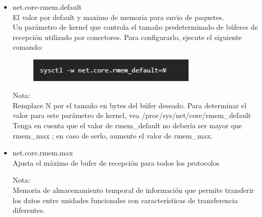 \begin{itemize}
\item net.core-rmem.default
	\\El valor por default y maximo de memoria para envio de paquetes.
	\\Un parámetro de kernel que controla el tamaño predeterminado de búferes de recepción utilizado por conectores. Para configurarlo, ejecute el siguiente comando:

\begin{figure}[htb]
\begin{center}
\includegraphics[width=8cm]{./Imagenes/ajhordy}
\end{center}
\end{figure}

Nota:
\\Remplace N por el tamaño en bytes del búfer deseado. Para determinar el valor para este parámetro de kernel, vea {/proc/sys/net/core/rmem\_default} 
\\Tenga en cuenta que el valor de rmem\_default no debería ser mayor que rmem\_max ; en caso de serlo, aumente el valor de rmem\_max.

	\item net.core.rmem.max
	\\Ajusta el m\'aximo de bufer de recepci\'on para todos los protocolos
\vspace*{0.10in}


Nota:
\\Memoria de almacenamiento temporal de informaci\'on que permite transferir los datos entre unidades funcionales con caracter\'isticas de transferencia diferentes.

\end{itemize} 
